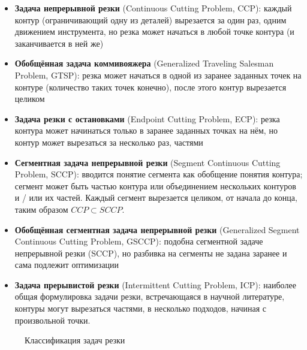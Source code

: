 \documentclass[10pt]{SPIIRAS_Proceedings}
\begin{document}
\begin{itemize}
  \item
  \textbf{Задача непрерывной резки}
  (Continuous Cutting Problem, CCP):
  каждый контур
  (ограничивающий одну из деталей)
  вырезается за один раз,
  одним движением инструмента,
  но резка может начаться в любой точке контура
  (и заканчивается в ней же)

  \item
  \textbf{Обобщённая задача коммивояжера}
  (Generalized Traveling Salesman Problem, GTSP):
  резка может начаться в одной из заранее
  заданных точек на контуре
  (количество таких точек конечно),
  после этого контур вырезается целиком

  \item
  \textbf{Задача резки с остановками}
  (Endpoint Cutting Problem, ECP):
  резка контура может начинаться только в
  заранее заданных точках на нём,
  но контур может вырезаться за несколько раз,
  частями

  \item
  \textbf{Сегментная задача непрерывной резки}
  (Segment Continuous Cutting Problem, SCCP):
  вводится понятие сегмента
  как обобщение понятия контура;
  сегмент может быть частью контура
  или объединением нескольких контуров
  и / или их частей.
  Каждый сегмент вырезается целиком,
  от начала до конца,
  таким образом
  $ CCP \subset SCCP$.

  \item
  \textbf{Обобщённая сегментная задача непрерывной резки}
  (Generalized Segment Continuous Cutting Problem, GSCCP):
  подобна сегментной задаче непрерывной резки
  (SCCP),
  но разбивка на сегменты не задана заранее
  и сама подлежит оптимизации

  \item
  \textbf{Задача прерывистой резки}
  (Intermittent Cutting Problem, ICP):
  наиболее общая формулировка задачи резки,
  встречающаяся в научной литературе,
  контуры могут вырезаться частями,
  в несколько подходов,
  начиная с произвольной точки.
\end{itemize}

\begin{figure}
  \centering
  \def\svgwidth{\columnwidth}
  
  \caption{Классификация задач резки}
  \label{CP-classes}
\end{figure}
\end{document}

